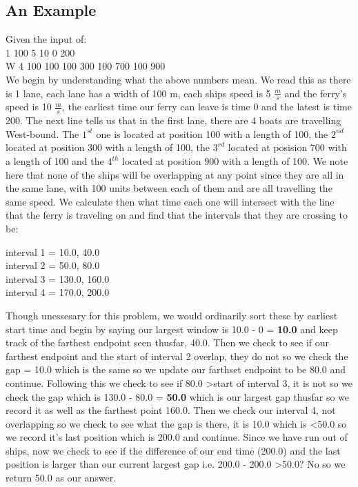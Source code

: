 \documentclass[12pt]{article}
\begin{document}
\subsection{An Example}
Given the input of: \\
1 100 5 10 0 200 \\
W 4 100 100 100 300 100 700 100 900 \\

We begin by understanding what the above numbers mean. We read this as there is 1 lane, each lane
has a width of 100 m, each ships speed is 5 $\frac{m}{s}$ and the ferry's speed is 10 $\frac{m}{s}$,
the earliest time our ferry can leave is time 0 and the latest is time 200. The next line tells us
that in the first lane, there are 4 boats are travelling West-bound. The $1^{st}$ one is located at
position 100 with a length of 100, the $2^{nd}$ located at position 300 with a length of 100, the
$3^{rd}$ located at posision 700 with a length of 100 and the $4^{th}$ located at position 900 with
a length of 100.
\newpage
We note here that none of the ships will be overlapping at any point since they are all in the same
lane, with 100 units between each of them and are all travelling the same speed. We calculate then
what time each one will intersect with the line that the ferry is traveling on and find that the
intervals that they are crossing to be:
\begin{center}
interval 1 = 10.0, 40.0 \\
interval 2 = 50.0, 80.0 \\
interval 3 = 130.0, 160.0 \\
interval 4 = 170.0, 200.0
\end{center}
Though unessesary for this problem, we would ordinarily sort these by earliest start time and begin
by saying our largest window is 10.0 - 0 = \textbf{10.0} and keep track of the farthest endpoint seen thusfar,
40.0. Then we check to see if our farthest endpoint and the start of interval 2 overlap, they do not
so we check the gap = 10.0 which is the same so we update our farthset endpoint to be 80.0 and continue.
Following this we check to see if 80.0 \textgreater start of interval 3, it is not so we check the gap
which is 130.0 - 80.0 = \textbf{50.0} which is our largest gap thusfar so we record it as well as the farthest
point 160.0. Then we check our interval 4, not overlapping so we check to see what the gap is there,
it is 10.0 which is \textless 50.0 so we record it's last position which is 200.0 and continue.  Since
we have run out of ships, now we check to see if the difference of our end time (200.0) and the last position
is larger than our current largest gap i.e. 200.0 - 200.0 \textgreater 50.0? No so we return 50.0 as our answer.

\end{document}
